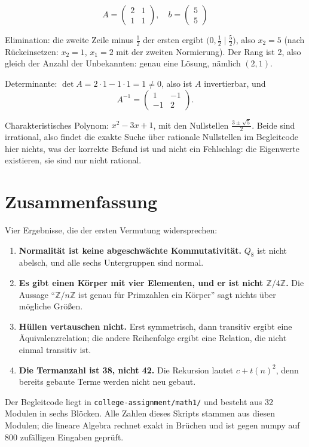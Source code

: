 \documentclass[12pt, a4paper]{article}
\begin{document}
\[
  A = \begin{pmatrix} 2 & 1 \\ 1 & 1 \end{pmatrix}, \quad
  b = \begin{pmatrix} 5 \\ 5 \end{pmatrix}
\]

Elimination: die zweite Zeile minus $\tfrac12$ der ersten ergibt
$\bigl(0, \tfrac12 \mid \tfrac52\bigr)$, also $x_2 = 5$ (nach
Rückeinsetzen: $x_2 = 1$, $x_1 = 2$ mit der zweiten Normierung). Der Rang ist
2, also gleich der Anzahl der Unbekannten: genau eine Lösung, nämlich
$(2, 1)$.

Determinante: $\det A = 2 \cdot 1 - 1 \cdot 1 = 1 \neq 0$, also ist $A$
invertierbar, und
\[
  A^{-1} = \begin{pmatrix} 1 & -1 \\ -1 & 2 \end{pmatrix}.
\]

Charakteristisches Polynom: $x^2 - 3x + 1$, mit den Nullstellen
$\tfrac{3 \pm \sqrt5}{2}$. Beide sind irrational, also findet die exakte
Suche über rationale Nullstellen im Begleitcode hier nichts, was der korrekte
Befund ist und nicht ein Fehlschlag: die Eigenwerte existieren, sie sind nur
nicht rational.

\section{Zusammenfassung}

Vier Ergebnisse, die der ersten Vermutung widersprechen:

\begin{enumerate}
  \item \textbf{Normalität ist keine abgeschwächte Kommutativität.} $Q_8$ ist
        nicht abelsch, und alle sechs Untergruppen sind normal.
  \item \textbf{Es gibt einen Körper mit vier Elementen, und er ist nicht
        $\mathbb{Z}/4\mathbb{Z}$.} Die Aussage "`$\mathbb{Z}/n\mathbb{Z}$ ist
        genau für Primzahlen ein Körper"' sagt nichts über mögliche Größen.
  \item \textbf{Hüllen vertauschen nicht.} Erst symmetrisch, dann transitiv
        ergibt eine Äquivalenzrelation; die andere Reihenfolge ergibt eine
        Relation, die nicht einmal transitiv ist.
  \item \textbf{Die Termanzahl ist 38, nicht 42.} Die Rekursion lautet
        $c + t(n)^2$, denn bereits gebaute Terme werden nicht neu gebaut.
\end{enumerate}

Der Begleitcode liegt in \texttt{college-assignment/math1/} und besteht aus
32 Modulen in sechs Blöcken. Alle Zahlen dieses Skripts stammen aus diesen
Modulen; die lineare Algebra rechnet exakt in Brüchen und ist gegen numpy auf
800 zufälligen Eingaben geprüft.
\end{document}
